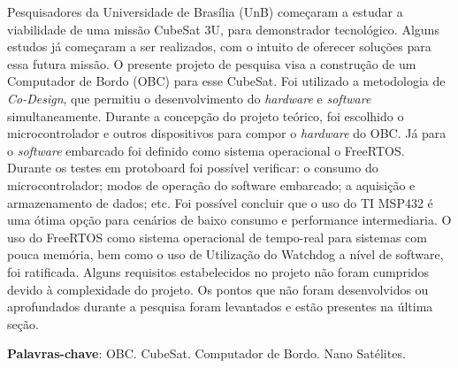 \begin{resumo}
	
Pesquisadores da Universidade de Brasília (UnB) começaram a estudar a viabilidade de uma missão CubeSat 3U, para demonstrador tecnológico. Alguns estudos já começaram a ser realizados, com o intuito de oferecer soluções para essa futura missão. O presente projeto de pesquisa visa a construção de um Computador de Bordo (OBC) para esse CubeSat. Foi utilizado a metodologia de \textit{Co-Design}, que permitiu o desenvolvimento do \textit{hardware} e \textit{software} simultaneamente. Durante a concepção do projeto teórico, foi escolhido o microcontrolador e outros dispositivos para compor o \textit{hardware} do OBC. Já para o \textit{software} embarcado foi definido como sistema operacional o FreeRTOS. Durante os testes em protoboard foi possível verificar: o consumo do microcontrolador; modos de operação do software embarcado; a aquisição e armazenamento de dados; etc. Foi possível concluir que o uso do TI MSP432 é uma ótima opção para cenários de baixo consumo e performance intermediaria. O uso do FreeRTOS como sistema operacional de tempo-real para sistemas com pouca memória, bem como o uso de Utilização do Watchdog a nível de software, foi ratificada. Alguns requisitos estabelecidos no projeto não foram cumpridos devido à complexidade do projeto. Os pontos que não foram desenvolvidos ou aprofundados durante a pesquisa foram levantados e estão presentes na última seção.

 \vspace{\onelineskip}
    
 \noindent
 \textbf{Palavras-chave}: OBC. CubeSat. Computador de Bordo. Nano Satélites.

\end{resumo}
